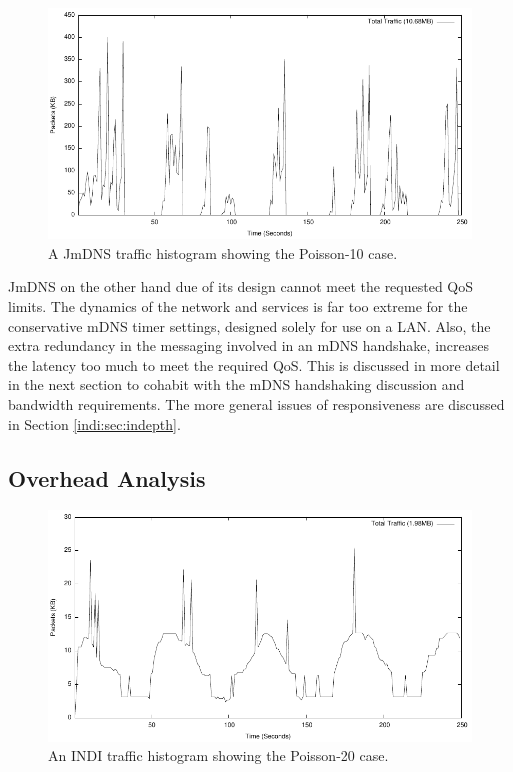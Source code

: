 \begin{figure}
\centering
\includegraphics[scale=1.0]{jmdns10packet-distribution.pdf}
\caption{A JmDNS traffic histogram showing the Poisson-10 case.   } 
\label{indi:fig:jmdns-10-traffic}
\end{figure}
 

JmDNS on the other hand due of its design cannot meet the requested QoS limits.  The dynamics of the network and services is far too extreme for the conservative mDNS timer settings, designed solely for use on a LAN. Also, the extra redundancy in the messaging involved in an mDNS handshake, increases the latency too much to meet the required QoS. This is discussed in more detail in the next section to cohabit with the mDNS handshaking discussion and bandwidth requirements.   The more general issues of responsiveness are discussed in Section \ref{indi:sec:indepth}.

\subsection{Overhead Analysis}   
\label{subsec:overhead}

\begin{figure}
\centering
\includegraphics[scale=1.0]{indi20packet-distribution.pdf}
\caption{An INDI traffic histogram showing the Poisson-20 case.} 
\label{indi:fig:indi-20-traffic}
\end{figure}

